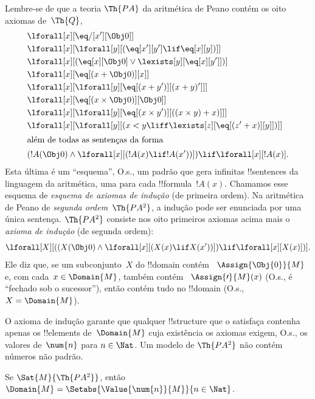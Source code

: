 \documentclass[../../../include/open-logic-section]{subfiles}
\begin{document}


Lembre-se de que a teoria $\Th{PA}$ da aritmética de Peano contém os oito
axiomas de~$\Th{Q}$,
\begin{align*}
& \lforall[x][\eq/[x'][\Obj 0]]\\
& \lforall[x][\lforall[y][(\eq[x'][y'] \lif \eq[x][y])]]\\
& \lforall[x][(\eq[x][\Obj 0] \lor \lexists[y][\eq[x][y']])]\\ 
& \lforall[x][\eq[(x + \Obj 0)][x]]\\
& \lforall[x][\lforall[y][\eq[(x + y')][(x + y)']]]\\
& \lforall[x][\eq[(x \times \Obj 0)][\Obj 0]]\\
& \lforall[x][\lforall[y][\eq[(x \times y')][((x \times y) + x)]]]\\
& \lforall[x][\lforall[y][(x < y \liff \lexists[z][\eq[(z' + x)][y]])]]\\
\intertext{além de todas as sentenças da forma}
& (!A(\Obj 0) \land \lforall[x][(!A(x) \lif !A(x'))]) \lif \lforall[x][!A(x)].
\end{align*}
Esta última é um ``esquema'', O.s.\@, um padrão que gera infinitas
!!{sentence}s da linguagem da aritmética, uma para cada !!{formula}~$!A(x)$.
Chamamos esse esquema de \emph{esquema de axiomas de indução} (de primeira
ordem). Na aritmética de Peano de \emph{segunda ordem}~$\Th{PA^2}$, a
indução pode ser enunciada por uma única sentença. $\Th{PA^2}$ consiste nos
oito primeiros axiomas acima mais o \emph{axioma de indução} (de segunda
ordem):
\[
\lforall[X][((X(\Obj 0) \land \lforall[x][(X(x) \lif X(x'))]) \lif \lforall[x][X(x)])].
\]
Ele diz que, se um subconjunto~$X$ do !!{domain} contém
~$\Assign{\Obj{0}}{M}$ e, com cada~$x \in \Domain{M}$, também contém
~$\Assign{\prime}{M}(x)$ (O.s.\@, é ``fechado sob o sucessor''), então
contém tudo no !!{domain} (O.s.\@, $X = \Domain{M}$).

O axioma de indução garante que qualquer !!{structure} que o satisfaça
contenha apenas os !!{element}s de~$\Domain{M}$ cuja existência os axiomas
exigem, O.s.\@, os valores de~$\num{n}$ para $n \in \Nat$. Um modelo de
$\Th{PA^2}$ não contém números não padrão.

\begin{thm}
Se $\Sat{M}{\Th{PA^2}}$, então $\Domain{M} =
\Setabs{\Value{\num{n}}{M}}{n \in \Nat}$.
\end{thm}
\end{document}
